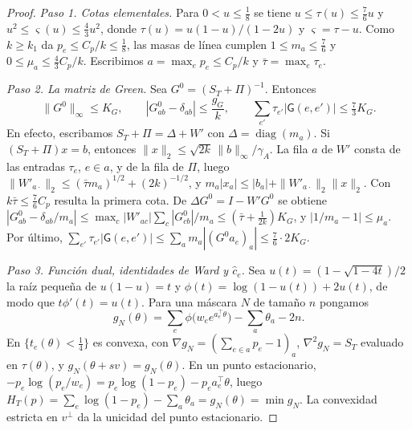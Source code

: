 \begin{proof}
\emph{Paso 1. Cotas elementales.} Para $0<u\le\tfrac18$ se tiene $u\le\tau(u)\le\tfrac76u$ y
$u^2\le\varsigma(u)\le\tfrac43u^2$, donde $\tau(u)=u(1-u)/(1-2u)$ y $\varsigma=\tau-u$. Como
$k\ge k_1$ da $p_e\le C_p/k\le\tfrac18$, las masas de línea cumplen $1\le m_a\le\tfrac76$ y
$0\le\mu_a\le\tfrac43C_p/k$. Escribimos $a=\max_ep_e\le C_p/k$ y $\bar\tau=\max_e\tau_e$.

\emph{Paso 2. La matriz de Green.} Sea $G^0=(S_T+\Pi)^{-1}$. Entonces
\begin{equation}\label{eq:green-torres}
 \|G^0\|_\infty\le K_G,\qquad |G^0_{ab}-\delta_{ab}|\le\frac{g_G}{k},\qquad
 \sum_{e'}\tau_{e'}|\mathsf G(e,e')|\le\tfrac73K_G .
\end{equation}
En efecto, escribamos $S_T+\Pi=\Delta+W'$ con $\Delta=\operatorname{diag}(m_a)$. Si $(S_T+\Pi)x=b$,
entonces $\|x\|_2\le\sqrt{2k}\,\|b\|_\infty/\gamma_A$. La fila $a$ de $W'$ consta de las entradas
$\tau_e$, $e\in a$, y de la fila de $\Pi$, luego $\|W'_{a\cdot}\|_2\le(\bar\tau m_a)^{1/2}+(2k)^{-1/2}$,
y $m_a|x_a|\le|b_a|+\|W'_{a\cdot}\|_2\|x\|_2$. Con $k\bar\tau\le\tfrac76C_p$ resulta la primera cota. De
$\Delta G^0=I-W'G^0$ se obtiene $|G^0_{ab}-\delta_{ab}/m_a|\le\max_c|W'_{ac}|\sum_c|G^0_{cb}|/m_a
\le(\bar\tau+\tfrac1{2k})K_G$, y $|1/m_a-1|\le\mu_a$. Por último,
$\sum_{e'}\tau_{e'}|\mathsf G(e,e')|\le\sum_am_a|(G^0a_e)_a|\le\tfrac76\cdot2K_G$.

\emph{Paso 3. Función dual, identidades de Ward y $\hat c_e$.} Sea $u(t)=(1-\sqrt{1-4t})/2$ la raíz
pequeña de $u(1-u)=t$ y $\phi(t)=\log(1-u(t))+2u(t)$, de modo que $t\phi'(t)=u(t)$. Para una máscara
$N$ de tamaño $n$ pongamos
\[
 g_N(\theta)=\sum_e\phi\bigl(w_ee^{a_e^\top\theta}\bigr)-\sum_a\theta_a-2n .
\]
En $\{t_e(\theta)<\tfrac14\}$ es convexa, con $\nabla g_N=(\sum_{e\in a}p_e-1)_a$,
$\nabla^2g_N=S_T$ evaluado en $\tau(\theta)$, y $g_N(\theta+sv)=g_N(\theta)$. En un punto estacionario,
$-p_e\log(p_e/w_e)=p_e\log(1-p_e)-p_ea_e^\top\theta$, luego $H_T(p)=\sum_e\log(1-p_e)-\sum_a\theta_a
=g_N(\theta)=\min g_N$. La convexidad estricta en $v^\perp$ da la unicidad del punto estacionario.


\end{proof}
